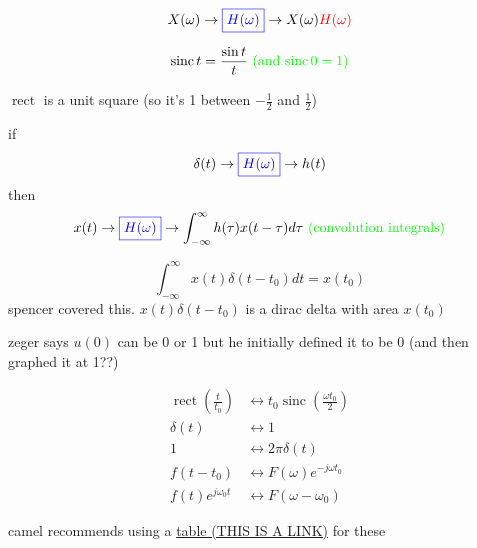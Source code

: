\documentclass[a5paper, fleqn]{article}
\newcommand{\vocab}[1]{\textbf{\textcolor{blue}{#1}}}
\newcommand{\emf}[1]{\textcolor{red}{#1}}
\newcommand{\note}[1]{\textcolor{green}{#1}}
\DeclareMathOperator{\sinc}{sinc}
\DeclareMathOperator{\rect}{rect}
\begin{document}
\[X(\omega) \to \vocab{$\boxed{H(\omega)}$} \to X(\omega) \emf{H(\omega)}\]

\[\sinc t = \frac{\sin t}{t} ~ \note{\text{(and $\sinc 0 = 1$)}}\]

$\rect$ is a unit square (so it's 1 between $-\frac{1}{2}$ and $\frac{1}{2}$)

if
\[\delta(t) \to \vocab{$\boxed{H(\omega)}$} \to h(t)\]
then
\[x(t) \to \vocab{$\boxed{H(\omega)}$} \to \int_{-\infty}^\infty h(\tau) x(t - \tau) d\tau ~ \note{\text{(convolution integrals)}}\]

\[\int_{-\infty}^\infty x(t) \delta(t - t_0) dt = x(t_0)\]
spencer covered this. $x(t) \delta(t - t_0)$ is a dirac delta with area $x(t_0)$

zeger says $u(0)$ can be 0 or 1 but he initially defined it to be 0 (and then graphed it at 1??)

\begin{align*}
  \rect(\frac{t}{t_0})  & \leftrightarrow t_0 \sinc(\frac{\omega t_0}{2}) \\
  \delta(t)             & \leftrightarrow 1                               \\
  1                     & \leftrightarrow 2 \pi \delta(t)                 \\
  f(t - t_0)            & \leftrightarrow F(\omega) e^{-j\omega t_0}      \\
  f(t) e^{j \omega_0 t} & \leftrightarrow F(\omega - \omega_0)
\end{align*}

camel recommends using a \href{https://ethz.ch/content/dam/ethz/special-interest/baug/ibk/structural-mechanics-dam/education/identmeth/fourier.pdf}{table (THIS IS A LINK)} for these
\end{document}
